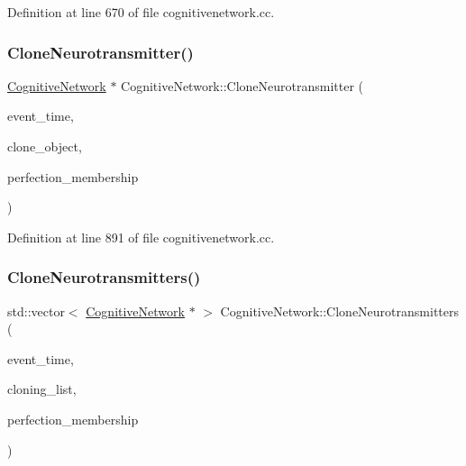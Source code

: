 Definition at line 670 of file cognitivenetwork.\+cc.

\mbox{\label{class_cognitive_network_af78d31471a121844e4735d809c900502}} 
\subsubsection{\texorpdfstring{Clone\+Neurotransmitter()}{CloneNeurotransmitter()}}
{\footnotesize\ttfamily \mbox{\hyperlink{class_cognitive_network}{Cognitive\+Network}} $\ast$ Cognitive\+Network\+::\+Clone\+Neurotransmitter (\begin{DoxyParamCaption}\item[{std\+::chrono\+::time\+\_\+point$<$ \mbox{\hyperlink{universe_8h_a0ef8d951d1ca5ab3cfaf7ab4c7a6fd80}{Clock}} $>$}]{event\+\_\+time,  }\item[{\mbox{\hyperlink{class_cognitive_network}{Cognitive\+Network}} $\ast$}]{clone\+\_\+object,  }\item[{double}]{perfection\+\_\+membership }\end{DoxyParamCaption})}



Definition at line 891 of file cognitivenetwork.\+cc.

\mbox{\label{class_cognitive_network_a2b2d40d179f95ff96e9aa0559234cc31}} 
\subsubsection{\texorpdfstring{Clone\+Neurotransmitters()}{CloneNeurotransmitters()}}
{\footnotesize\ttfamily std\+::vector$<$ \mbox{\hyperlink{class_cognitive_network}{Cognitive\+Network}} $\ast$ $>$ Cognitive\+Network\+::\+Clone\+Neurotransmitters (\begin{DoxyParamCaption}\item[{std\+::chrono\+::time\+\_\+point$<$ \mbox{\hyperlink{universe_8h_a0ef8d951d1ca5ab3cfaf7ab4c7a6fd80}{Clock}} $>$}]{event\+\_\+time,  }\item[{std\+::vector$<$ \mbox{\hyperlink{class_cognitive_network}{Cognitive\+Network}} $\ast$$>$}]{cloning\+\_\+list,  }\item[{double}]{perfection\+\_\+membership }\end{DoxyParamCaption})}



